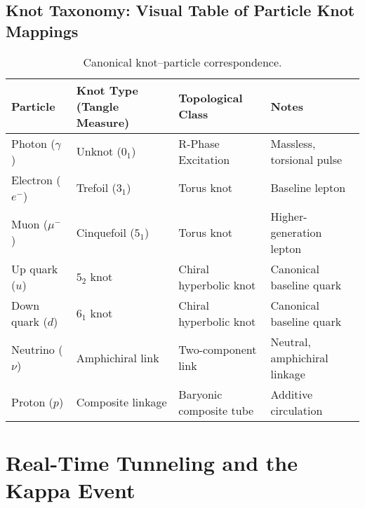 \documentclass[10pt,reprint,aps,onecolumn,nofootinbib]{revtex4-2}
\begin{document}
        \subsection*{Knot Taxonomy: Visual Table of Particle Knot Mappings}
            \begin{table}[h!]\label{tab:knotetable}
                \centering
                \small
                \begin{adjustbox}{max width=\textwidth}
                    \begin{tabular}{|l|l|l|l|}
                        \hline
                            \textbf{Particle} & \textbf{Knot Type (Tangle Measure)} & \textbf{Topological Class} & \textbf{Notes} \\
                        \hline
                            Photon ($\gamma$) & Unknot ($0_1$) & R-Phase Excitation & Massless, torsional pulse~ \cite{sstCanon, sstLagrangian} \\
                            Electron ($e^-$) & Trefoil ($3_1$) & Torus knot & Baseline lepton~ \cite{sstCanon, sstLagrangian} \\
                            Muon ($\mu^-$) & Cinquefoil ($5_1$) & Torus knot & Higher-generation lepton~ \cite{sstLagrangian} \\
                            Up quark ($u$) & $5_2$ knot & Chiral hyperbolic knot & Canonical baseline quark~ \cite{sstCanon, sstLagrangian} \\
                            Down quark ($d$) & $6_1$ knot & Chiral hyperbolic knot & Canonical baseline quark~ \cite{sstCanon, sstLagrangian4} \\
                            Neutrino ($\nu$) & Amphichiral link & Two-component link & Neutral, amphichiral linkage~ \cite{sstLagrangian} \\
                            Proton ($p$) & Composite linkage & Baryonic composite tube & Additive circulation~ \cite{chiralSwirl} \\
                        \hline
                    \end{tabular}
                \end{adjustbox}
                \caption{Canonical knot–particle correspondence.}
            \end{table}


    \section{Real-Time Tunneling and the Kappa Event}\label{sec:KappaTunneling}
\end{document}
